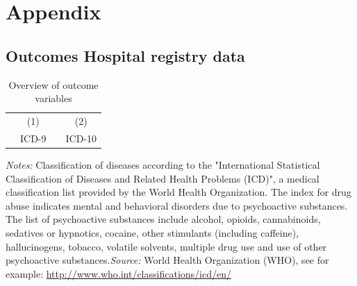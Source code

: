 \documentclass[11pt, a4paper,draft]{article} %
\begin{document}
\newpage
\section{Appendix}
\subsection{Outcomes Hospital registry data}


\begin{table}[h] %
\begin{threeparttable}
\centering %
\caption{Overview of outcome variables} %
\label{tab:outcomes_coding_main_chapters} 
\begin{tabular}{lrrr} %
\toprule %
        &\multicolumn{1}{c}{(1)}& &\multicolumn{1}{c}{(2)}\\
&\multicolumn{1}{c}{ICD-9} & & \multicolumn{1}{c}{ICD-10} \\ 
\midrule

\bottomrule %
\end{tabular}
\begin{tablenotes}
      \scriptsize{ \item \textit{Notes:} Classification of diseases according to the "International Statistical Classification of Diseases and Related Health Problems (ICD)", a medical classification list provided by the World Health Organization. The index for drug abuse indicates mental and behavioral disorders due to psychoactive substances. The list of psychoactive substances include alcohol, opioids, cannabinoids, sedatives or hypnotics, cocaine, other stimulants (including caffeine), hallucinogens, tobacco, volatile solvents,  multiple drug use and use of other psychoactive substances.\newline \textit{Source:} World Health Organization (WHO), see for example: \href{http://www.who.int/classifications/icd/en/}{http://www.who.int/classifications/icd/en/} }
    \end{tablenotes}
  \end{threeparttable}
\end{table}
\end{document}
